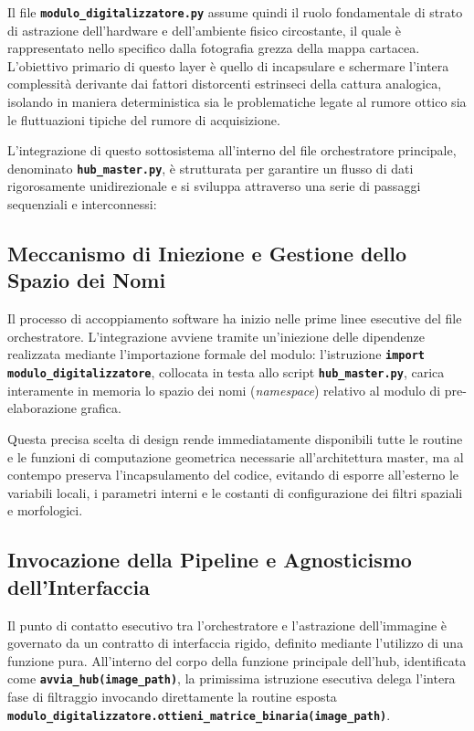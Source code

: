 \documentclass[12pt,a4paper]{article}
\begin{document}
    Il file \textbf{\texttt{modulo\_digitalizzatore.py}} assume quindi il ruolo fondamentale di strato di astrazione dell'hardware e dell'ambiente fisico circostante, il quale è rappresentato nello specifico dalla fotografia grezza della mappa cartacea. L'obiettivo primario di questo layer è quello di incapsulare e schermare l'intera complessità derivante dai fattori distorcenti estrinseci della cattura analogica, isolando in maniera deterministica sia le problematiche legate al rumore ottico sia le fluttuazioni tipiche del rumore di acquisizione.

    L'integrazione di questo sottosistema all'interno del file orchestratore principale, denominato \textbf{\texttt{hub\_master.py}}, è strutturata per garantire un flusso di dati rigorosamente unidirezionale e si sviluppa attraverso una serie di passaggi sequenziali e interconnessi:

    \subsection{Meccanismo di Iniezione e Gestione dello Spazio dei Nomi}
    Il processo di accoppiamento software ha inizio nelle prime linee esecutive del file orchestratore. L'integrazione avviene tramite un'iniezione delle dipendenze realizzata mediante l'importazione formale del modulo: l'istruzione \textbf{\texttt{import modulo\_digitalizzatore}}, collocata in testa allo script \textbf{\texttt{hub\_master.py}}, carica interamente in memoria lo spazio dei nomi (\textit{namespace}) relativo al modulo di pre-elaborazione grafica.

    Questa precisa scelta di design rende immediatamente disponibili tutte le routine e le funzioni di computazione geometrica necessarie all'architettura master, ma al contempo preserva l'incapsulamento del codice, evitando di esporre all'esterno le variabili locali, i parametri interni e le costanti di configurazione dei filtri spaziali e morfologici.

    \subsection{Invocazione della Pipeline e Agnosticismo dell'Interfaccia}
    Il punto di contatto esecutivo tra l'orchestratore e l'astrazione dell'immagine è governato da un contratto di interfaccia rigido, definito mediante l'utilizzo di una funzione pura. All'interno del corpo della funzione principale dell'hub, identificata come \textbf{\texttt{avvia\_hub(image\_path)}}, la primissima istruzione esecutiva delega l'intera fase di filtraggio invocando direttamente la routine esposta \textbf{\texttt{modulo\_digitalizzatore.ottieni\_matrice\_binaria(image\_path)}}.
\end{document}
